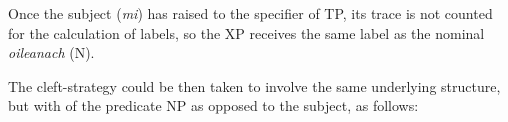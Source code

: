 \documentclass[output=paper]{langsci/langscibook}
\begin{document}
\ea
\z

%
%

Once the subject (\emph{mi}) has raised to the specifier of TP, its trace is not counted for the calculation of labels, so the XP receives the same label as the nominal \emph{oileanach} (N).

The cleft-strategy could be then taken to involve the same underlying structure,
but with  of the predicate NP as opposed to the subject, as follows:

\ea
%
\z
\end{document}
